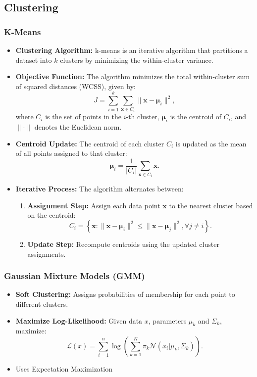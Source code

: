 \documentclass[12pt,a4paper]{article}
\begin{document}
\subsection{Clustering}
\subsubsection{K-Means} 
\begin{itemize}
    \item \textbf{Clustering Algorithm:} k-means is an iterative algorithm that partitions a dataset into \(k\) clusters by minimizing the within-cluster variance.
    
    \item \textbf{Objective Function:} The algorithm minimizes the total within-cluster sum of squared distances (WCSS), given by:
    \[
    J = \sum_{i=1}^{k} \sum_{\mathbf{x} \in C_i} \|\mathbf{x} - \mathbf{\mu}_i\|^2,
    \]
    where \(C_i\) is the set of points in the \(i\)-th cluster, \(\mathbf{\mu}_i\) is the centroid of \(C_i\), and \(\|\cdot\|\) denotes the Euclidean norm.
    
    \item \textbf{Centroid Update:} The centroid of each cluster \(C_i\) is updated as the mean of all points assigned to that cluster:
    \[
    \mathbf{\mu}_i = \frac{1}{|C_i|} \sum_{\mathbf{x} \in C_i} \mathbf{x}.
    \]
    
    \item \textbf{Iterative Process:} The algorithm alternates between:
    \begin{enumerate}
        \item \textbf{Assignment Step:} Assign each data point \(\mathbf{x}\) to the nearest cluster based on the centroid:
        \[
        C_i = \left\{\mathbf{x} : \|\mathbf{x} - \mathbf{\mu}_i\|^2 \leq \|\mathbf{x} - \mathbf{\mu}_j\|^2, \forall j \neq i\right\}.
        \]
        \item \textbf{Update Step:} Recompute centroids using the updated cluster assignments.
    \end{enumerate}
\end{itemize}
\subsubsection{Gaussian Mixture Models (GMM)}
\begin{itemize}
    \item \textbf{Soft Clustering:} Assigns probabilities of membership for each point to different clusters.
    \item \textbf{Maximize Log-Likelihood:} Given data $x$, parameters $\mu_k$ and $\Sigma_k$, maximize:
    \[ \mathcal{L}(x) = \sum_{i=1}^n \log\left(\sum_{k=1}^K \pi_k \mathcal{N}(x_i | \mu_k, \Sigma_k)\right). \]
    \item Uses Expectation Maximization
\end{itemize}
\end{document}
